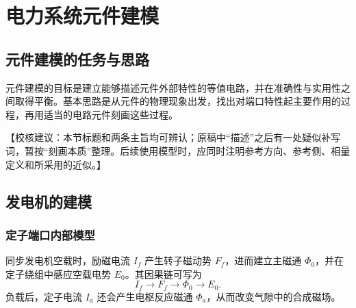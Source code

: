 \documentclass[
  12pt,
  UTF8,
  a4paper,
  fontset=fandol,
  oneside,
  openany
]{ctexrep}
\newcommand{\reviewnote}[1]{%
  \par\smallskip
  {\color{reviewgray}\small\noindent【校核建议：#1】\par}
  \smallskip
}
\begin{document}
\chapter{电力系统元件建模}

\section{元件建模的任务与思路}

元件建模的目标是建立能够描述元件外部特性的等值电路，并在准确性与实用性之间取得平衡。基本思路是从元件的物理现象出发，找出对端口特性起主要作用的过程，再用适当的电路元件刻画这些过程。

\reviewnote{本节标题和两条主旨均可辨认；原稿中“描述”之后有一处疑似补写词，暂按“刻画本质”整理。后续使用模型时，应同时注明参考方向、参考侧、相量定义和所采用的近似。}

\section{发电机的建模}

\subsection{定子端口内部模型}

同步发电机空载时，励磁电流 $I_f$ 产生转子磁动势 $F_f$，进而建立主磁通 $\Phi_0$，并在定子绕组中感应空载电势 $E_0$。其因果链可写为
\begin{equation}
  I_f \longrightarrow F_f \longrightarrow \Phi_0 \longrightarrow E_0 .
\end{equation}
负载后，定子电流 $I_a$ 还会产生电枢反应磁通 $\Phi_a$，从而改变气隙中的合成磁场。
\end{document}
